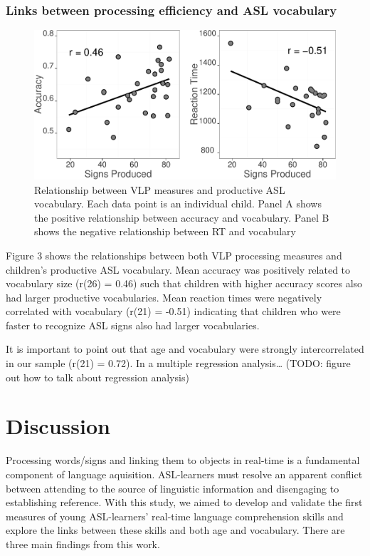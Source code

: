 \documentclass[12pt,]{article}
\begin{document}
\subsubsection{Links between processing efficiency and ASL
vocabulary}\label{links-between-processing-efficiency-and-asl-vocabulary}

\begin{figure}[htbp]
\centering
\includegraphics{Figs/vocab scatter plots-1.pdf}
\caption{Relationship between VLP measures and productive ASL
vocabulary. Each data point is an individual child. Panel A shows the
positive relationship between accuracy and vocabulary. Panel B shows the
negative relationship between RT and vocabulary}
\end{figure}

Figure 3 shows the relationships between both VLP processing measures
and children's productive ASL vocabulary. Mean accuracy was positively
related to vocabulary size (r(26) = 0.46) such that children with higher
accuracy scores also had larger productive vocabularies. Mean reaction
times were negatively correlated with vocabulary (r(21) = -0.51)
indicating that children who were faster to recognize ASL signs also had
larger vocabularies.

It is important to point out that age and vocabulary were strongly
intercorrelated in our sample (r(21) = 0.72). In a multiple regression
analysis\ldots{} (TODO: figure out how to talk about regression
analysis)

\section{Discussion}\label{discussion}

Processing words/signs and linking them to objects in real-time is a
fundamental component of language aquisition. ASL-learners must resolve
an apparent conflict between attending to the source of linguistic
information and disengaging to establishing reference. With this study,
we aimed to develop and validate the first measures of young
ASL-learners' real-time language comprehension skills and explore the
links between these skills and both age and vocabulary. There are three
main findings from this work.
\end{document}
